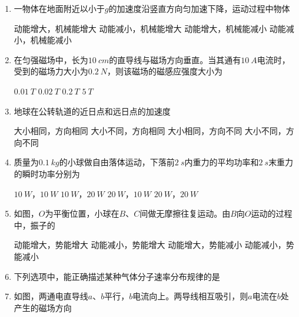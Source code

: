 \begin{enumerate}
\item
一物体在地面附近以小于$ g $的加速度沿竖直方向匀加速下降，运动过程中物体  

\fourchoices
{动能增大，机械能增大}
{动能减小，机械能增大}
{动能增大，机械能减小}
{动能减小，机械能减小}




\item
在匀强磁场中，长为$ 10 \ cm $的直导线与磁场方向垂直。当其通有$ 10 \ A $电流时，受到的磁场力大小为$ 0.2 \ N $，则该磁场的磁感应强度大小为  

\fourchoices
{$ 0.01 \ T $}
{$ 0.02 \ T $}
{$ 0.2 \ T $}
{$ 5 \ T $}




\item
地球在公转轨道的近日点和远日点的加速度  

\fourchoices
{大小相同，方向相同}
{大小不同，方向相同}
{大小相同，方向不同}
{大小不同，方向不同}




\item
质量为$ 0.1 \ kg $的小球做自由落体运动，下落前$ 2 \ s $内重力的平均功率和$ 2 \ s $末重力的瞬时功率分别为  

\fourchoices
{$ 10 \ W $，$ 10 \ W $}
{$ 10 \ W $，$ 20 \ W $}
{$ 20 \ W $，$ 10 \ W $}
{$ 20 \ W $，$ 20 \ W $}



\item
如图，$ O $为平衡位置，小球在$ B $、$ C $间做无摩擦往复运动。由$ B $向$ O $运动的过程中，振子的  
\begin{figure}[h!]
	\centering
	
\end{figure}

\fourchoices
{动能增大，势能增大}
{动能减小，势能增大}
{动能增大，势能减小}
{动能减小，势能减小}


\item 
下列选项中，能正确描述某种气体分子速率分布规律的是  

\pfourchoices
{}
{}
{}
{}




\item
如图，两通电直导线$ a $、$ b $平行，$ b $电流向上。两导线相互吸引，则$ a $电流在$ b $处产生的磁场方向  
\begin{figure}[h!]
	\centering
	
\end{figure}


\end{enumerate}
